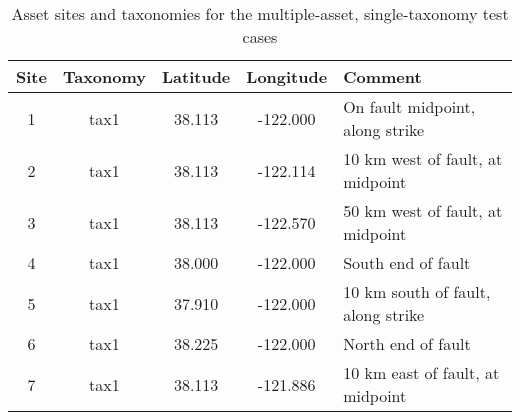 \begin{table}

\centering
\begin{tabular}{ c c c c l }

\hline
\rowcolor{anti-flashwhite}
\bf{Site} & \bf{Taxonomy} & \bf{Latitude} & \bf{Longitude} & \bf{Comment} \\
\hline
1 & tax1 & 38.113 & -122.000 & On fault midpoint, along strike \\
2 & tax1 & 38.113 & -122.114 & 10 km west of fault, at midpoint \\
3 & tax1 & 38.113 & -122.570 & 50 km west of fault, at midpoint \\
4 & tax1 & 38.000 & -122.000 & South end of fault \\
5 & tax1 & 37.910 & -122.000 & 10 km south of fault, along strike \\
6 & tax1 & 38.225 & -122.000 & North end of fault \\
7 & tax1 & 38.113 & -121.886 & 10 km east of fault, at midpoint \\
\hline
\end{tabular}

\caption{Asset sites and taxonomies for the multiple-asset, single-taxonomy test cases}
\label{tab:assets-tax1}
\end{table}